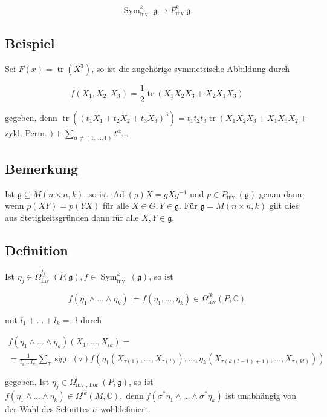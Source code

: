 \documentclass[10pt, letterpaper]{article}
\begin{document}
$$
\operatorname{Sym}_{\text {inv }}^{k} \mathfrak{g} \rightarrow P_{\text {inv }}^{k} \mathfrak{g} .
$$

\subsection*{Beispiel}
Sei $F(x)=\operatorname{tr}\left(X^{3}\right)$, so ist die zugehörige symmetrische Abbildung durch

$$
f\left(X_{1}, X_{2}, X_{3}\right)=\frac{1}{2} \operatorname{tr}\left(X_{1} X_{2} X_{3}+X_{2} X_{1} X_{3}\right)
$$

gegeben, denn $\operatorname{tr}\left(\left(t_{1} X_{1}+t_{2} X_{2}+t_{3} X_{3}\right)^{3}\right)=t_{1} t_{2} t_{3} \operatorname{tr}\left(X_{1} X_{2} X_{3}+X_{1} X_{3} X_{2}+\right.$ zykl. Perm. $)+\sum_{\alpha \neq(1, \ldots, 1)} t^{\alpha} \ldots$

\subsection*{Bemerkung}
Ist $\mathfrak{g} \subseteq M(n \times n, k)$, so ist $\operatorname{Ad}(g) X=g X g^{-1}$ und $p \in P_{\text {inv }}(\mathfrak{g})$ genau dann, wenn $p(X Y)=p(Y X)$ für alle $X \in G, Y \in \mathfrak{g}$. Für $\mathfrak{g}=M(n \times n, k)$ gilt dies aus Stetigkeitsgründen dann für alle $X, Y \in \mathfrak{g}$.

\subsection*{Definition}
Ist $\eta_{j} \in \Omega_{\text {inv }}^{l_{j}}(P, \mathfrak{g}), f \in \operatorname{Sym}_{\text {inv }}^{k}(\mathfrak{g})$, so ist

$$
f\left(\eta_{1} \wedge \ldots \wedge \eta_{k}\right):=f\left(\eta_{1}, \ldots, \eta_{k}\right) \in \Omega_{\mathrm{inv}}^{l k}(P, \mathbb{C})
$$

mit $l_{1}+\ldots+l_{k}=: l$ durch

$$
\begin{gathered}
f\left(\eta_{1} \wedge \ldots \wedge \eta_{k}\right)\left(X_{1}, \ldots, X_{l k}\right)= \\
=\frac{1}{l_{1}!\ldots l_{k}!} \sum_{\tau} \operatorname{sign}(\tau) f\left(\eta_{1}\left(X_{\tau(1)}, \ldots, X_{\tau(l)}\right), \ldots, \eta_{k}\left(X_{\tau(k(l-1)+1)}, \ldots, X_{\tau(k l)}\right)\right)
\end{gathered}
$$

gegeben. Ist $\eta_{j} \in \Omega_{\text {inv }, \text { hor }}^{l}(P, \mathfrak{g})$, so ist $f\left(\eta_{1} \wedge \ldots \wedge \eta_{k}\right) \in \Omega^{l k}(M, \mathbb{C}), \operatorname{denn} f\left(\sigma^{*} \eta_{1} \wedge\right. \left.\ldots \wedge \sigma^{*} \eta_{k}\right)$ ist unabhängig von der Wahl des Schnittes $\sigma$ wohldefiniert.
\end{document}
